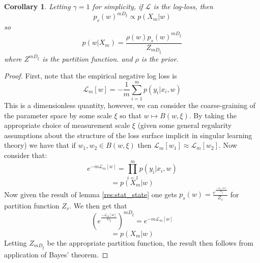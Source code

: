 \documentclass{article} %
\newtheorem*{corollary*}{Corollary}
\theoremstyle{definition}
\begin{document}
\begin{corollary*}
Letting $\gamma = 1$ for simplicity, if $\mathcal{L}$ is the log-loss, then 
\begin{equation}
    p_{s}(w)^{mD_\xi} \propto p(X_m|w)
\end{equation}
so
\begin{equation}
    p(w|X_m) = \frac{\rho(w)p_{s}(w)^{mD_\xi} }{Z_{mD_\xi}}
\end{equation}
where $Z^{mD_\xi}$ is the partition function. and $\rho$ is the prior.
\end{corollary*}
\begin{proof}
First, note that the empirical negative log loss is
\begin{equation}
    \mathcal{L}_m[w] = -\frac{1}{m}\sum^m_{i=1} p(y_i|x_i, w)
\end{equation}
This is a dimensionless quantity, however, we can consider the coarse-graining of the parameter space by some scale $\xi$ so that $w \mapsto B(w, \xi)$. By taking the appropriate choice of measurement scale $\xi$ (given some general regularity assumptions about the structure of the loss surface implicit in singular learning theory) we have that if $w_1, w_2 \in B(w, \xi)$ then $\mathcal{L}_m[w_1] \approx \mathcal{L}_m[w_2]$. Now consider that:
\begin{equation}
    e^{-m\mathcal{L}_m[w]} = \prod_{i=1}^m p(y_i|x_i, w)
\end{equation}
\begin{equation}
    = p(X_m|w)
\end{equation}
Now given the result of lemma \ref{res:stat_state} one gets $p_s(w) = \frac{e^{\frac{-\mathcal{L}_m[w]}{D_\xi}}}{Z_s}$ for partition function $Z_s$. We then get that
\begin{equation}
    (e^{\frac{-\mathcal{L}_m[w]}{D_\xi}})^{mD_\xi}
    = e^{-m\mathcal{L}_m[w]}
\end{equation}
\begin{equation}
    = p(X_m|w)
\end{equation}
Letting $Z_{mD_\xi}$ be the appropriate partition function, the result then follows from application of Bayes' theorem.
\end{proof}
\end{document}
